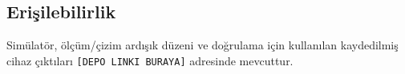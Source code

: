 \documentclass[conference]{IEEEtran}
\begin{document}
\subsection*{Erişilebilirlik}
Simülatör, ölçüm/çizim ardışık düzeni ve doğrulama için kullanılan kaydedilmiş cihaz çıktıları
\texttt{[DEPO LINKI BURAYA]} adresinde mevcuttur.



\end{document}
